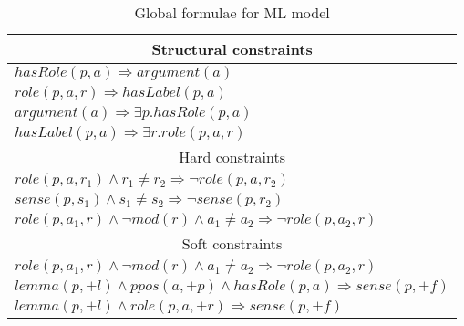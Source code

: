 \begin{table}[ht]
    \centering
    \small
    \begin{tabular}{|p{7.0cm}|}\hline
        \multicolumn{1}{|c|}{Structural constraints}\\\hline
       $hasRole(p,a) \Rightarrow argument(a)$\\
       $role(p,a,r) \Rightarrow hasLabel(p,a)$\\\hline
       $argument(a)  \Rightarrow\exists p.hasRole(p,a)$\\
       $hasLabel(p,a) \Rightarrow\exists r. role(p,a,r)$\\\hline
       \multicolumn{1}{|c|}{Hard constraints}\\\hline
       $role(p,a,r_1) \wedge r_1 \neq r_2 \Rightarrow \neg role(p,a,r_2)$\\
       $sense(p,s_1) \wedge s_1 \neq s_2 \Rightarrow \neg sense(p,r_2) $\\
       $role\left(p,a_{1},r\right)\wedge \neg mod\left(r\right)\wedge a_{1}\neq 
       a_{2}  \Rightarrow \neg role\left(p,a_{2},r\right) $ \\\hline
       \multicolumn{1}{|c|}{Soft constraints}\\\hline
       $role\left(p,a_{1},r\right)\wedge \neg mod\left(r\right)\wedge a_{1}\neq 
       a_{2}  \Rightarrow \neg role\left(p,a_{2},r\right) $ \\
       $ lemma(p,+l) \wedge ppos(a,+p) \wedge hasRole(p,a)  \Rightarrow 
       sense(p,+f) $ \\
       $ lemma(p,+l) \wedge role(p,a,+r) \Rightarrow sense(p,+f) $ \\
        \hline
    \end{tabular}
    \caption{Global formulae for ML model}
    \label{tbl:global}
\end{table}

